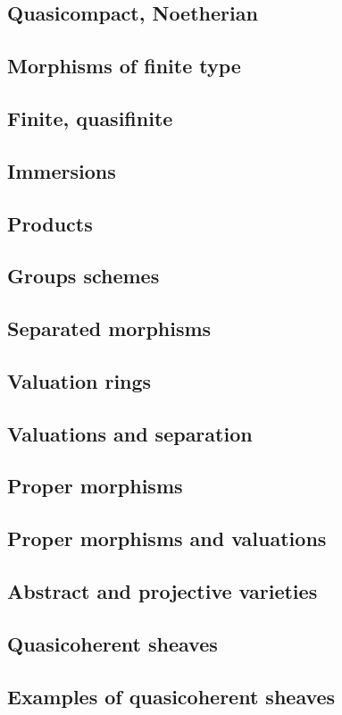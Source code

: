 \documentclass [11 pt, oneside, margin = 1 in] {article}
\begin{document}
\subsection{Quasicompact, Noetherian}
\subsection{Morphisms of finite type}
\subsection{Finite, quasifinite}
\subsection{Immersions}
\subsection{Products}
\subsection{Groups schemes}
\subsection{Separated morphisms}
\subsection{Valuation rings}
\subsection{Valuations and separation}
\subsection{Proper morphisms}
\subsection{Proper morphisms and valuations}
\subsection{Abstract and projective varieties}
\subsection{Quasicoherent sheaves}
\subsection{Examples of quasicoherent sheaves}
\end{document}
